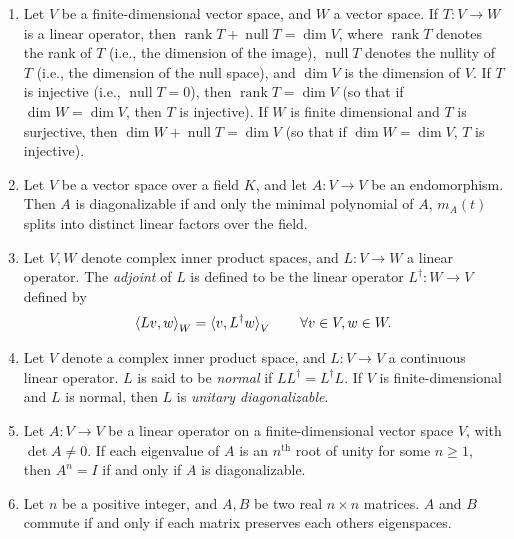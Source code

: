 \documentclass{article}
\begin{document}
\begin{enumerate}[series = algebra]
		\item Let $V$ be a finite-dimensional vector space, and $W$ a vector space. If $T: V \to W$ is a linear operator, then $\operatorname{rank}{T} + \operatorname{null}{T} = \dim{V}$, where $\operatorname{rank}{T}$ denotes the rank of $T$ (i.e., the dimension of the image), $\operatorname{null}{T}$ denotes the nullity of $T$ (i.e., the dimension of the null space), and $\dim{V}$ is the dimension of $V$. If $T$ is injective (i.e., $\operatorname{null}{T} = 0$), then $\operatorname{rank}{T} = \dim{V}$ (so that if $\dim{W} = \dim{V}$, then $T$ is injective). If $W$ is finite dimensional and $T$ is surjective, then $\dim{W} + \operatorname{null}{T} = \dim{V}$ (so that if $\dim{W} = \dim{V}$, $T$ is injective). 
		\item Let $V$ be a vector space over a field $K$, and let $A: V \to V$ be an endomorphism. Then $A$ is diagonalizable if and only the minimal polynomial of $A$, $m_{A}(t)$ splits into distinct linear factors over the field. 
		\item Let $V, W$ denote complex inner product spaces, and $L: V \to W$ a linear operator. The \textit{adjoint} of $L$ is defined to be the linear operator $L^{\dagger}: W \to V$ defined by 
		\begin{equation*}
			\braket{Lv,w}_{W} = \braket{v, L^{\dagger}w}_{V} \qquad \forall v \in V, w \in W. 
		\end{equation*}
		\item Let $V$ denote a complex inner product space, and $L: V \to V$ a continuous linear operator. $L$ is said to be \textit{normal} if $LL^{\dagger} = L^{\dagger}L$. If $V$ is finite-dimensional and $L$ is normal, then $L$ is \textit{unitary diagonalizable}. 
		\item Let $A: V \to V$ be a linear operator on a finite-dimensional vector space $V$, with $\det{A} \neq 0$. If each eigenvalue of $A$ is an $n^{\text{th}}$ root of unity for some $n \geq 1$, then $A^{n}  = I$ if and only if $A$ is diagonalizable.
		\item Let $n$ be a positive integer, and $A, B$ be two real $n \times n$ matrices. $A$ and $B$ commute if and only if each matrix preserves each others eigenspaces.
	\end{enumerate}
\end{document}
